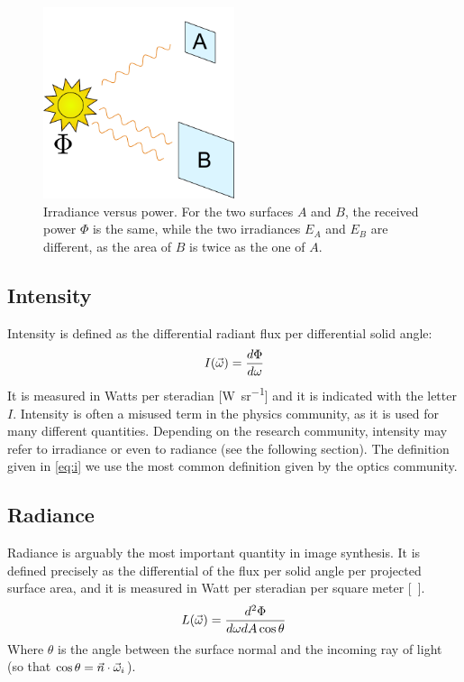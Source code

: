 \begin{figure}[!ht]
\centering
\includegraphics[width=0.5\textwidth]{images/irradiance.pdf}
\caption{Irradiance versus power. For the two surfaces $A$ and $B$, the received power $\Phi$ is the same, while the two irradiances $E_A$ and $E_B$ are different, as the area of $B$ is twice as the one of $A$.}
\label{fig:irradiance}
\end{figure}
 

\subsection{Intensity}
Intensity is defined as the differential radiant flux per differential solid angle:
\begin{equation}
I(\vec{\omega}) = \frac{d \Phi}{d \omega}
\label{eq:i}
\end{equation}
It is measured in Watts per steradian [\si{\watt\per\steradian}] and it is indicated with the letter $I$. Intensity is often a misused term in the physics community, as it is used for many different quantities. Depending on the research community, intensity may refer to irradiance or even to radiance (see the following section). The definition given in \ref{eq:i} we use the most common definition given by the optics community.

\subsection{Radiance}
Radiance is arguably the most important quantity in image synthesis. It is defined precisely as the differential of the flux per solid angle per projected surface area, and it is measured in Watt per steradian per square meter [\si{\watt\per\steradian\meter\square}].
$$
L(\vec{\omega}) = \frac{d^2 \Phi}{d\omega dA \cos \theta}
$$
Where $\theta$ is the angle between the surface normal and the incoming ray of light (so that $\cos\theta = \vec{n} \cdot \vec{\omega}_i$). 

